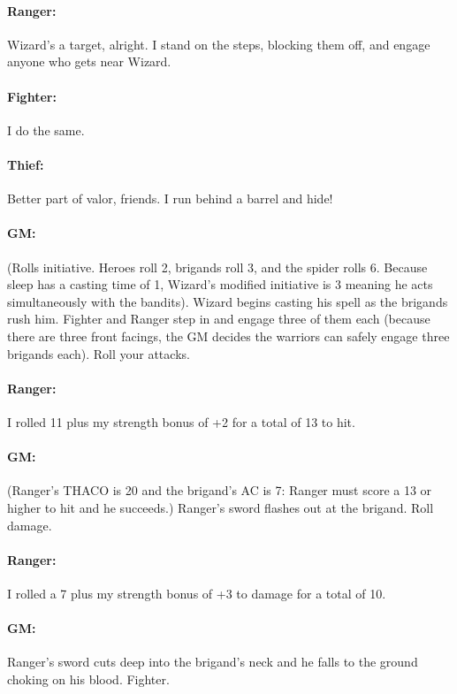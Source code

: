 \begin{multicols}{2}
\paragraph{Ranger:}  Wizard's a target, alright.  I stand on the steps, blocking them off, and engage anyone who gets near Wizard.

\paragraph{Fighter:}  I do the same.

\paragraph{Thief:}  Better part of valor, friends.  I run behind a barrel and hide!

\paragraph{GM:} (Rolls initiative.  Heroes roll 2, brigands roll 3, and the spider rolls 6.  Because sleep has a casting time of 1, Wizard's modified initiative is 3 meaning he acts simultaneously with the bandits).  Wizard begins casting his spell as the brigands rush him.  Fighter and Ranger step in and engage three of them each (because there are three front facings, the GM decides the warriors can safely engage three brigands each).  Roll your attacks.

\paragraph{Ranger:} I rolled 11 plus my strength bonus of +2 for a total of 13 to hit.

\paragraph{GM:} (Ranger's THACO is 20 and the brigand's AC is 7: Ranger must score a 13 or higher to hit and he succeeds.)  Ranger's sword flashes out at the brigand.  Roll damage.

\paragraph{Ranger:} I rolled a 7 plus my strength bonus of +3 to damage for a total of 10.

\paragraph{GM:}  Ranger's sword cuts deep into the brigand's neck and he falls to the ground choking on his blood.  Fighter.


\end{multicols}
